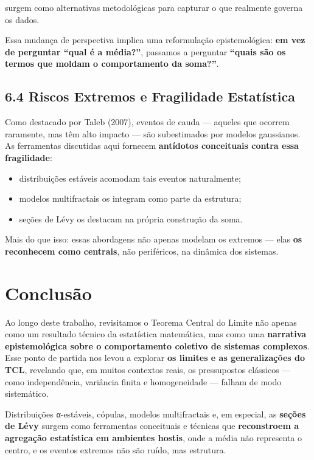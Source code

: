 \documentclass[
]{agujournal2019}
\providecommand{\tightlist}{%
  \setlength{\itemsep}{0pt}\setlength{\parskip}{0pt}}\usepackage{longtable,booktabs,array}
\begin{document}
surgem como alternativas metodológicas para capturar o que realmente
governa os dados.

Essa mudança de perspectiva implica uma reformulação epistemológica:
\textbf{em vez de perguntar ``qual é a média?''}, passamos a perguntar
\textbf{``quais são os termos que moldam o comportamento da soma?''}.

\subsection{6.4 Riscos Extremos e Fragilidade
Estatística}\label{riscos-extremos-e-fragilidade-estatuxedstica}

Como destacado por Taleb (2007), eventos de cauda --- aqueles que
ocorrem raramente, mas têm alto impacto --- são subestimados por modelos
gaussianos. As ferramentas discutidas aqui fornecem \textbf{antídotos
conceituais contra essa fragilidade}:

\begin{itemize}
\tightlist
\item
  distribuições estáveis acomodam tais eventos naturalmente;
\item
  modelos multifractais os integram como parte da estrutura;
\item
  seções de Lévy os destacam na própria construção da soma.
\end{itemize}

Mais do que isso: essas abordagens não apenas modelam os extremos ---
elas \textbf{os reconhecem como centrais}, não periféricos, na dinâmica
dos sistemas.

\section{Conclusão}\label{conclusuxe3o}

Ao longo deste trabalho, revisitamos o Teorema Central do Limite não
apenas como um resultado técnico da estatística matemática, mas como uma
\textbf{narrativa epistemológica sobre o comportamento coletivo de
sistemas complexos}. Esse ponto de partida nos levou a explorar
\textbf{os limites e as generalizações do TCL}, revelando que, em muitos
contextos reais, os pressupostos clássicos --- como independência,
variância finita e homogeneidade --- falham de modo sistemático.

Distribuições α-estáveis, cópulas, modelos multifractais e, em especial,
as \textbf{seções de Lévy} surgem como ferramentas conceituais e
técnicas que \textbf{reconstroem a agregação estatística em ambientes
hostis}, onde a média não representa o centro, e os eventos extremos não
são ruído, mas estrutura.
\end{document}
